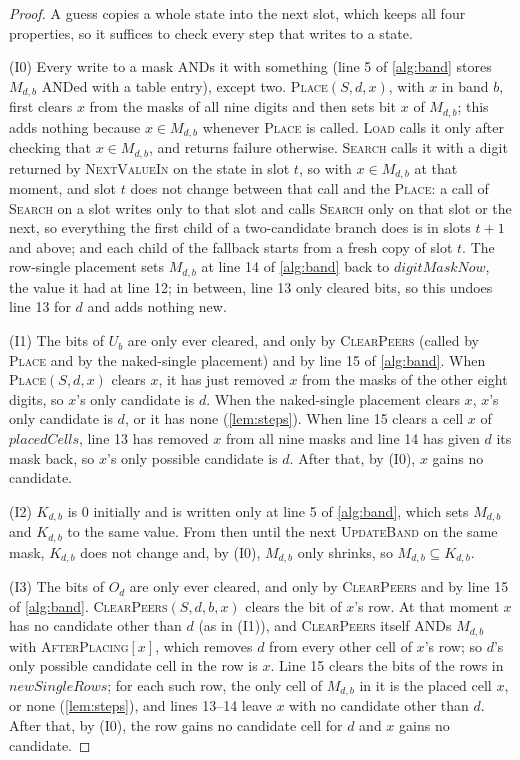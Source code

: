 \documentclass[11pt]{article}
\theoremstyle{definition}
\theoremstyle{plain}
\let\origtextsc\textsc
\renewcommand{\textsc}[1]{\textup{\origtextsc{#1}}}
\begin{document}
\begin{proof}
A guess copies a whole state into the next slot, which keeps all four properties, so it suffices to check every step
that writes to a state.

(I0) Every write to a mask ANDs it with something (line 5 of \cref{alg:band} stores $M_{d,b}$ ANDed with a table entry), except two. \textsc{Place}$(S,d,x)$, with $x$ in band $b$, first clears $x$ from
the masks of all nine digits and then sets bit $x$ of $M_{d,b}$; this adds nothing because $x\in M_{d,b}$ whenever
\textsc{Place} is called. \textsc{Load} calls it only after checking that $x\in M_{d,b}$, and returns failure
otherwise. \textsc{Search} calls it with a digit returned by \textsc{NextValueIn} on the state in slot $t$, so with
$x\in M_{d,b}$ at that moment, and slot $t$ does not change between that call and the \textsc{Place}: a call of
\textsc{Search} on a slot writes only to that slot and calls \textsc{Search} only on that slot or the next, so
everything the first child of a two-candidate branch does is in slots $t+1$ and above; and each child of the fallback
starts from a fresh copy of slot $t$. The row-single placement sets $M_{d,b}$ at line 14 of \cref{alg:band} back to $\mathit{digitMaskNow}$, the
value it had at line 12; in between, line 13 only cleared bits, so this undoes line 13 for $d$ and adds nothing new.

(I1) The bits of $U_b$ are only ever cleared, and only by \textsc{ClearPeers} (called by \textsc{Place} and by the
naked-single placement) and by line 15 of \cref{alg:band}. When \textsc{Place}$(S,d,x)$ clears $x$, it has just
removed $x$ from the masks of the other eight digits, so $x$'s only candidate is $d$. When the naked-single placement
clears $x$, $x$'s only candidate is $d$, or it has none (\cref{lem:steps}). When line 15 clears a cell $x$ of
$\mathit{placedCells}$, line 13 has removed $x$ from all nine masks and line 14 has given $d$ its mask back, so $x$'s
only possible candidate is $d$. After that, by (I0), $x$ gains no candidate.

(I2) $K_{d,b}$ is 0 initially and is written only at line 5 of \cref{alg:band}, which sets $M_{d,b}$ and $K_{d,b}$ to
the same value. From then until the next \textsc{UpdateBand} on the same mask, $K_{d,b}$ does not change and, by (I0),
$M_{d,b}$ only shrinks, so $M_{d,b}\subseteq K_{d,b}$.

(I3) The bits of $O_d$ are only ever cleared, and only by \textsc{ClearPeers} and by line 15 of \cref{alg:band}.
\textsc{ClearPeers}$(S,d,b,x)$ clears the bit of $x$'s row. At that moment $x$ has no candidate other than $d$ (as in
(I1)), and \textsc{ClearPeers} itself ANDs $M_{d,b}$ with \textsc{AfterPlacing}$[x]$, which removes $d$ from every
other cell of $x$'s row; so $d$'s only possible candidate cell in the row is $x$. Line 15 clears the bits of the rows
in $\mathit{newSingleRows}$; for each such row, the only cell of $M_{d,b}$ in it is the placed cell $x$, or none
(\cref{lem:steps}), and lines 13--14 leave $x$ with no candidate other than $d$. After that, by (I0), the row gains no
candidate cell for $d$ and $x$ gains no candidate.
\end{proof}
\end{document}
